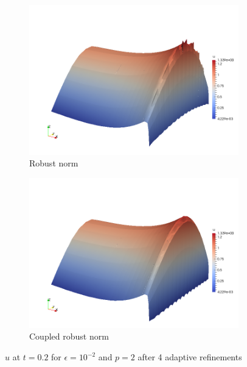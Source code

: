 \documentclass[Dissertation.tex]{subfiles}
\begin{document}
\begin{figure}[ht]
\centering
\begin{subfigure}[t]{0.48\textwidth}
\centering
\includegraphics[width=\textwidth]{Confusion/Robustness/TransientConfusion2D_Robust_1e=2_p2_t02.png}
\caption{Robust norm}
\end{subfigure}
\begin{subfigure}[t]{0.48\textwidth}
\centering
\includegraphics[width=\textwidth]{Confusion/Robustness/TransientConfusion2D_CoupledRobust_1e=2_p2_t02.png}
\caption{Coupled robust norm}
\end{subfigure}
\caption{$u$ at $t=0.2$ for $\epsilon=10^{-2}$ and $p=2$ after 4 adaptive refinements}
\label{fig:surfacePlots}
\end{figure}
\end{document}

